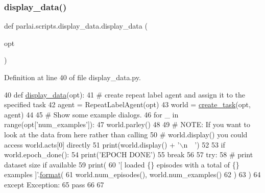 \subsubsection{\texorpdfstring{display\+\_\+data()}{display\_data()}}
{\footnotesize\ttfamily def parlai.\+scripts.\+display\+\_\+data.\+display\+\_\+data (\begin{DoxyParamCaption}\item[{}]{opt }\end{DoxyParamCaption})}



Definition at line 40 of file display\+\_\+data.\+py.


\begin{DoxyCode}
40 \textcolor{keyword}{def }\hyperlink{namespaceparlai_1_1scripts_1_1display__data_af47c3f49de57cd1a9397b88bf36a8213}{display\_data}(opt):
41     \textcolor{comment}{# create repeat label agent and assign it to the specified task}
42     agent = RepeatLabelAgent(opt)
43     world = \hyperlink{namespaceparlai_1_1core_1_1worlds_a11923c10b545c7ecc1b08fe2242d9c2c}{create\_task}(opt, agent)
44 
45     \textcolor{comment}{# Show some example dialogs.}
46     \textcolor{keywordflow}{for} \_ \textcolor{keywordflow}{in} range(opt[\textcolor{stringliteral}{'num\_examples'}]):
47         world.parley()
48 
49         \textcolor{comment}{# NOTE: If you want to look at the data from here rather than calling}
50         \textcolor{comment}{# world.display() you could access world.acts[0] directly}
51         print(world.display() + \textcolor{stringliteral}{'\(\backslash\)n~~'})
52 
53         \textcolor{keywordflow}{if} world.epoch\_done():
54             print(\textcolor{stringliteral}{'EPOCH DONE'})
55             \textcolor{keywordflow}{break}
56 
57     \textcolor{keywordflow}{try}:
58         \textcolor{comment}{# print dataset size if available}
59         print(
60             \textcolor{stringliteral}{'[ loaded \{\} episodes with a total of \{\} examples ]'}.\hyperlink{namespaceparlai_1_1chat__service_1_1services_1_1messenger_1_1shared__utils_a32e2e2022b824fbaf80c747160b52a76}{format}(
61                 world.num\_episodes(), world.num\_examples()
62             )
63         )
64     \textcolor{keywordflow}{except} Exception:
65         \textcolor{keywordflow}{pass}
66 
67 
\end{DoxyCode}
\mbox{\label{namespaceparlai_1_1scripts_1_1display__data_a666e6177939b9a63961e56a1dfdc74b4}} 
